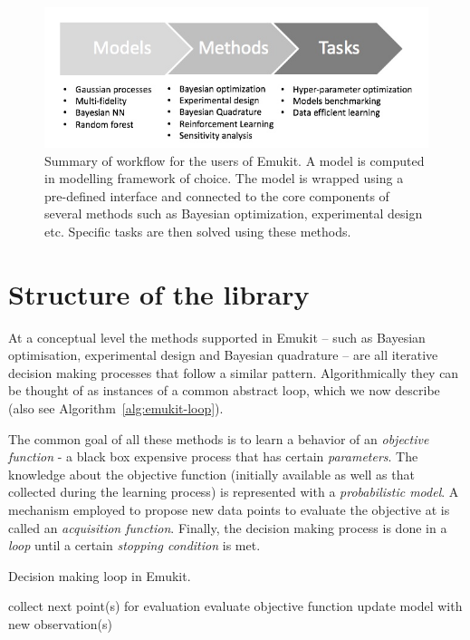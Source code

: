 \begin{figure}[h]
    \centering
    \includegraphics[scale=0.4]{workflow.png}  
    \caption{Summary of workflow for the users of Emukit. A model is computed in modelling framework of choice. The model is wrapped using a pre-defined interface and connected to the core components of several methods such as Bayesian optimization, experimental design etc. Specific tasks are then solved using these methods.}
    \label{figure:workflow}
\end{figure}

\section{Structure of the library}\label{sec:lib-structure}

At a conceptual level the methods supported in Emukit -- such as Bayesian optimisation, experimental design and Bayesian quadrature -- are all iterative decision making processes that follow a similar pattern. Algorithmically they can be thought of as instances of a common abstract loop, which we now describe (also see Algorithm~\ref{alg:emukit-loop}).

The common goal of all these methods is to learn a behavior of an \textit{objective function} - a black box expensive process that has certain \textit{parameters}. The knowledge about the objective function (initially available as well as that collected during the learning process) is represented with a \textit{probabilistic model}. A mechanism employed to propose new data points to evaluate the objective at is called an \textit{acquisition function}. Finally, the decision making process is done in a \textit{loop} until a certain \textit{stopping condition} is met. 

\begin{algorithm}[H]
  \caption{Decision making loop in Emukit.}
  \label{alg:emukit-loop}
  \begin{algorithmic}[1]
      \State collect next point(s) for evaluation
      \State evaluate objective function
      \State update model with new observation(s)
    \EndWhile
  \end{algorithmic}
\end{algorithm}

